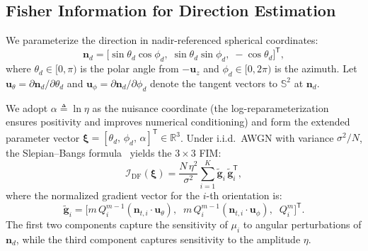 \documentclass[journal]{IEEEtran}
\newcommand{\added}[1]{{\color{blue}#1}}
\begin{document}
\added{\subsection{Fisher Information for Direction Estimation}
\label{subsec:FIM}
We parameterize the direction in nadir-referenced spherical coordinates:
\begin{equation}
\mathbf{n}_d = \bigl[\sin\theta_d\cos\phi_d,\;\sin\theta_d\sin\phi_d,\;-\cos\theta_d\bigr]^{\mathsf T},
\label{eq:nd_spherical}
\end{equation}
where $\theta_d\in[0,\pi)$ is the polar angle from $-\mathbf{u}_z$ and $\phi_d\in[0,2\pi)$ is the azimuth.  Let $\mathbf{u}_\theta = \partial\mathbf{n}_d/\partial\theta_d$ and $\mathbf{u}_\phi = \partial\mathbf{n}_d/\partial\phi_d$ denote the tangent vectors to $\mathbb{S}^2$ at $\mathbf{n}_d$.

We adopt $\alpha\triangleq\ln\eta$ as the nuisance coordinate (the log-reparameterization ensures positivity and improves numerical conditioning) and form the extended parameter vector $\boldsymbol{\xi}=[\theta_d,\,\phi_d,\,\alpha]^{\mathsf T}\in\mathbb{R}^3$.  Under i.i.d.\ AWGN with variance $\sigma^2/N$, the Slepian--Bangs formula~\cite{Kay1993} yields the $3\times3$ FIM:
\begin{equation}
\mathcal{I}_{\mathrm{DF}}(\boldsymbol\xi)
= \frac{N\,\eta^2}{\sigma^2}
  \sum_{i=1}^{K}
  \tilde{\mathbf g}_i\,\tilde{\mathbf g}_i^{\mathsf T},
\label{eq:FIM_DEB}
\end{equation}
where the normalized gradient vector for the $i$-th orientation is:
\begin{equation}
\tilde{\mathbf g}_i = \bigl[m\,Q_i^{m-1}(\mathbf{n}_{t,i}\!\cdot\!\mathbf{u}_\theta),\;\;m\,Q_i^{m-1}(\mathbf{n}_{t,i}\!\cdot\!\mathbf{u}_\phi),\;\;Q_i^m\bigr]^{\mathsf T}.
\label{eq:grad_xi}
\end{equation}
The first two components capture the sensitivity of $\mu_i$ to angular perturbations of $\mathbf{n}_d$, while the third component captures sensitivity to the amplitude $\eta$.}
\end{document}
